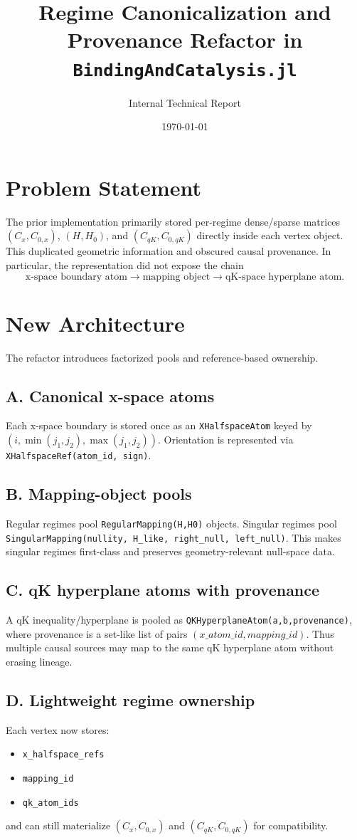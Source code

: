\documentclass[11pt]{article}
\title{Regime Canonicalization and Provenance Refactor in \texttt{BindingAndCatalysis.jl}}
\author{Internal Technical Report}
\date{\today}
\begin{document}
\maketitle

\section{Problem Statement}
The prior implementation primarily stored per-regime dense/sparse matrices $(C_x,C_{0,x})$, $(H,H_0)$, and $(C_{qK},C_{0,qK})$ directly inside each vertex object. This duplicated geometric information and obscured causal provenance. In particular, the representation did not expose the chain
\[
\text{x-space boundary atom} \longrightarrow \text{mapping object} \longrightarrow \text{qK-space hyperplane atom}.
\]

\section{New Architecture}
The refactor introduces factorized pools and reference-based ownership.
\subsection*{A. Canonical x-space atoms}
Each x-space boundary is stored once as an \texttt{XHalfspaceAtom} keyed by
\((i,\min(j_1,j_2),\max(j_1,j_2))\).
Orientation is represented via \texttt{XHalfspaceRef(atom\_id, sign)}.

\subsection*{B. Mapping-object pools}
Regular regimes pool \texttt{RegularMapping(H,H0)} objects.
Singular regimes pool \texttt{SingularMapping(nullity, H\_like, right\_null, left\_null)}.
This makes singular regimes first-class and preserves geometry-relevant null-space data.

\subsection*{C. qK hyperplane atoms with provenance}
A qK inequality/hyperplane is pooled as \texttt{QKHyperplaneAtom(a,b,provenance)}, where provenance is a set-like list of pairs \((x\_atom\_id, mapping\_id)\).
Thus multiple causal sources may map to the same qK hyperplane atom without erasing lineage.

\subsection*{D. Lightweight regime ownership}
Each vertex now stores:
\begin{itemize}[leftmargin=2em]
\item \texttt{x\_halfspace\_refs}
\item \texttt{mapping\_id}
\item \texttt{qk\_atom\_ids}
\end{itemize}
and can still materialize $(C_x,C_{0,x})$ and $(C_{qK},C_{0,qK})$ for compatibility.
\end{document}
